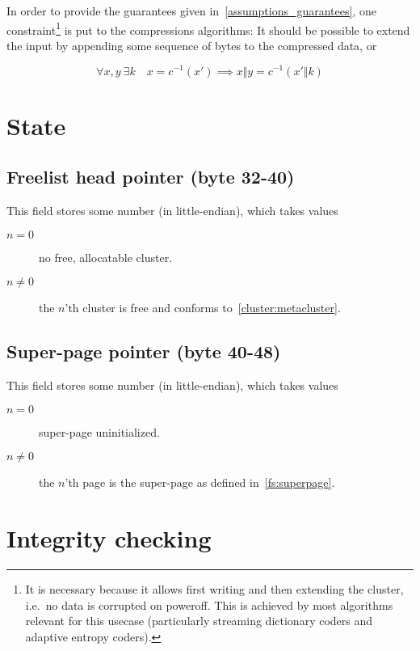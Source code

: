 \documentclass[11pt,a4paper]{report}
\newcommand{\concat}{\Vert}
\begin{document}
        In order to provide the guarantees given
        in~\ref{assumptions_guarantees}, one constraint\footnote{It is
        necessary because it allows first writing and then extending the
        cluster, i.e.\ no data is corrupted on poweroff.  This is achieved
        by most algorithms relevant for this usecase (particularly
        streaming dictionary coders and adaptive entropy coders).} is put to
        the compressions algorithms: It should be possible to extend the input
        by appending some sequence of bytes to the compressed data, or

        $$\forall x, y \  \exists k \quad x = c^{-1}(x') \implies x \concat y = c^{-1}(x' \concat k)$$

    \section{State}
        \subsection{Freelist head pointer (byte 32-40)}
        This field stores some number (in little-endian), which takes values

        \begin{description}
            \item [$n = 0$]    no free, allocatable cluster.
            \item [$n \neq 0$] the $n$'th cluster is free and conforms
                to~\ref{cluster:metacluster}.
        \end{description}

        \subsection{Super-page pointer (byte 40-48)}
        This field stores some number (in little-endian), which takes values

        \begin{description}
            \item [$n = 0$]    super-page uninitialized.
            \item [$n \neq 0$] the $n$'th page is the super-page as defined
                in~\ref{fs:superpage}.
        \end{description}

    \section{Integrity checking}
\end{document}
